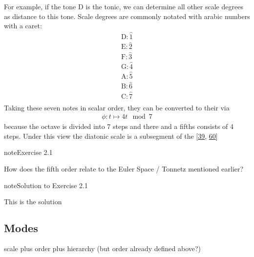 \documentclass[letterpaper,10pt,english]{sphinxmanual}
\begin{document}
\sphinxAtStartPar
For example, if the tone D is the tonic, we can determine all other scale degrees
as distance to this tone. Scale degrees are commonly notated with arabic numbers with a caret:
\begin{equation*}
\begin{split}\text{D}: \hat{1}\\
\text{E}: \hat{2}\\
\text{F}: \hat{3}\\
\text{G}: \hat{4}\\
\text{A}: \hat{5}\\
\text{B}: \hat{6}\\
\text{C}: \hat{7}\\\end{split}
\end{equation*}
\sphinxAtStartPar
Taking these seven notes in scalar order, they can be converted to their  via
\begin{equation*}
\begin{split}\phi: t \mapsto 4t \mod 7\end{split}
\end{equation*}
\sphinxAtStartPar
because the octave is divided into 7 steps and there and a fifths consists of 4 steps.
Under this view the diatonic scale is a subsegment
of the  {[}\hyperlink{cite.8_bibliography:id46}{39}, \hyperlink{cite.8_bibliography:id42}{60}{]}
 \label{exercise:ex:tonnetz}

\begin{sphinxadmonition}{note}{Exercise 2.1}



\sphinxAtStartPar
How does the fifth order relate to the Euler Space / Tonnetz mentioned earlier?
\end{sphinxadmonition}
 \label{2_scales_modes:sol:tonnetz}

\begin{sphinxadmonition}{note}{Solution to Exercise 2.1}



\sphinxAtStartPar
This is the solution
\end{sphinxadmonition}


\subsection{Modes}
\label{\detokenize{2_scales_modes:modes}}
\sphinxAtStartPar
scale plus order plus hierarchy (but order already defined above?)
\end{document}
